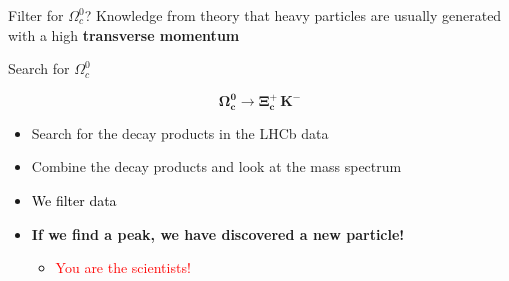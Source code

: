 \begin{frame}{Filter for $\Omega_c^0$?}
Knowledge from theory that heavy particles are usually generated with a high \textbf{transverse momentum}
\begin{center}
\end{center}
\end{frame}
\begin{frame}{Search for $\Omega_c^0$}

  \begin{center} \vspace{-1cm}
 \Large    \[\mathbf{\Omega_c^0 \rightarrow \Xi_c^+ \, K^-}\]
 \end{center}
   \begin{spacing}{1.5}
       
  
    \begin{itemize}    \item[\ding{202}]Search for the decay products in the LHCb data 
    \item[\ding{203}]Combine the decay products and look at the mass spectrum   
        \item[\ding{204}] \textcolor{black}{We filter data}
    \item[\ding{205}] \textcolor{back}{\textbf{If we find a peak, we have discovered a new particle! }}
    \begin{itemize} %
        \item [\ding{43}] \textcolor{red }{You are the scientists!}
    \end{itemize}
\end{itemize}
 \end{spacing}

\end{frame}
